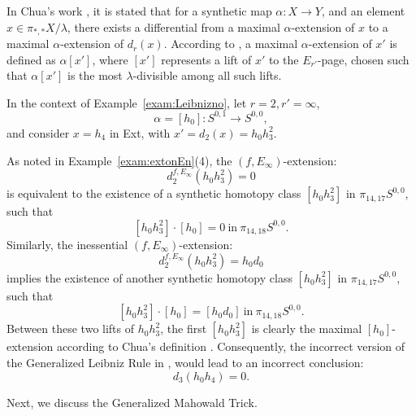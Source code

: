 \documentclass{amsart}
\numberwithin{equation}{section}
\begin{document}
\begin{remark} \label{rem:chuaerror}
    In Chua's work \cite[Theorem~12.9]{Chua}, it is stated that for a synthetic map $\alpha: X\rightarrow Y$, and an element $x \in \pi_{*,*}X/\lambda$, there exists a differential from a maximal $\alpha$-extension of $x$ to a maximal $\alpha$-extension of $d_r(x)$. According to  \cite[Definition~12.5]{Chua}, a maximal $\alpha$-extension of $x'$ is defined as $\alpha[x']$, where $[x']$ represents a lift of $x'$ to the $E_{r'}$-page, chosen such that $\alpha[x']$ is the most $\lambda$-divisible among all such lifts. 

    In the context of Example~\ref{exam:Leibnizno}, let $r=2, r'=\infty$,
    $$\alpha = [h_0]: S^{0,1} \rightarrow S^{0,0},$$
    and consider $x = h_4$ in Ext, with $x' = d_2(x) = h_0h_3^2$.

    As noted in Example~\ref{exam:extonEn}(4), the $(f, E_\infty)$-extension:
        $$d_2^{f, E_\infty} (h_0 h_3^2) = 0$$
         is equivalent to the existence of a synthetic homotopy class $[h_0 h_3^2]$ in $\pi_{14, 17} S^{0,0}$, such that
        $$[h_0 h_3^2] \cdot [h_0] = 0 \ \text{in} \ \pi_{14,18}S^{0,0}.$$
        Similarly, the inessential $(f, E_\infty)$-extension: 
        $$d_2^{f, E_\infty} (h_0 h_3^2) = h_0 d_0$$
        implies the existence of another synthetic homotopy class $[h_0 h_3^2]$ in $\pi_{14, 17} S^{0,0}$, such that
        $$[h_0 h_3^2] \cdot [h_0] = [h_0d_0] \ \text{in} \ \pi_{14,18}S^{0,0}.$$
        Between these two lifts of $h_0h_3^2$, the first $[h_0h_3^2]$ is clearly the maximal $[h_0]$-extension according to Chua’s definition \cite[Definition~12.5]{Chua}. Consequently, the incorrect version of the Generalized Leibniz Rule in \cite[Theorem~12.9]{Chua}, would lead to an incorrect conclusion:
        $$d_3(h_0h_4) = 0.$$
\end{remark}

Next, we discuss the Generalized Mahowald Trick. 
\end{document}

